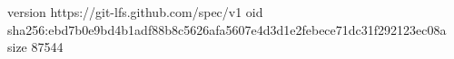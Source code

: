 version https://git-lfs.github.com/spec/v1
oid sha256:ebd7b0e9bd4b1adf88b8c5626afa5607e4d3d1e2febece71dc31f292123ec08a
size 87544
